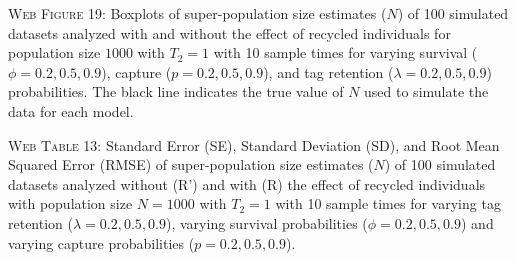 \documentclass[]{article}
\begin{document}
\textsc{Web Figure 19:} Boxplots of super-population size estimates
(\(N\)) of 100 simulated datasets analyzed with and without the effect
of recycled individuals for population size \(1000\) with \(T_2=1\) with
10 sample times for varying survival (\(\phi=0.2,0.5,0.9\)), capture
(\(p=0.2,0.5,0.9\)), and tag retention (\(\lambda=0.2,0.5,0.9\))
probabilities. The black line indicates the true value of \(N\) used to
simulate the data for each model.

\textsc{Web Table 13:} Standard Error (SE), Standard Deviation (SD), and
Root Mean Squared Error (RMSE) of super-population size estimates
(\(N\)) of 100 simulated datasets analyzed without (R') and with (R) the
effect of recycled individuals with population size \(N=1000\) with
\(T_2=1\) with 10 sample times for varying tag retention
(\(\lambda=0.2,0.5,0.9\)), varying survival probabilities
(\(\phi=0.2,0.5,0.9\)) and varying capture probabilities
(\(p=0.2,0.5,0.9\)).
\end{document}
